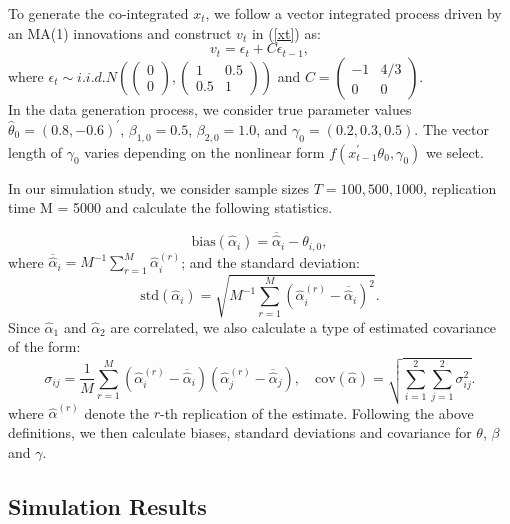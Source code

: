 \documentclass[a4paper,12pt,times,numbered,print,index]{report}
\numberwithin{equation}{section}
\begin{document}
	To generate the co-integrated $x_t$, we follow a vector integrated process driven by an MA(1) innovations and construct $v_t$ in (\ref{xt}) as:
	$$v_t = \epsilon_t + C\epsilon_{t-1},$$
	where $\epsilon_{t} \sim i.i.d. N\left(\left(\begin{array}{c}
	0 \\
	0
	\end{array}\right)
	,\left(\begin{array}{cc}1 & 0.5 \\ 0.5 & 1\end{array}\right)\right)$ and $C=\left(\begin{array}{cc} -1  & 4/ 3 \\ 0 & 0\end{array}\right)$. 
	\\
	
	In the data generation process, we consider true parameter values $\hat{\theta}_0 = (0.8, -0.6)^{\prime}$, $\beta_{1,0} = 0.5$, $\beta_{2,0} = 1.0$, and $\gamma_0 = (0.2, 0.3, 0.5)$. The vector length of $\gamma_{0}$ varies depending on the nonlinear form $f\left(x_{t-1}^{\prime }\theta _{0},\gamma _{0}\right)$ we select. 
	
	In our simulation study, we consider sample sizes $T = 100, 500,  1000$, replication time M = 5000 and calculate the following statistics.
	
	\[
	\text{bias}({\hat\alpha_i})=\overline{\widehat{\alpha}}_{i}-\theta _{i,0}, 
	\]%
	where $\overline{\widehat{\alpha}}_{i}=M^{-1}\sum_{r=1}^{M}\widehat{\alpha}_{i}^{(r)} $; and the standard deviation: 
	\[
	\text{std}({\hat\alpha_i}) =\sqrt{M^{-1}\sum_{r=1}^{M}\left( \widehat{\alpha}_{i}^{(r)}-\overline{\widehat{\alpha}}_{i}\right) ^{2}}. 
	\]%
	Since $\widehat{\alpha}_1$ and $\widehat{\alpha}_{2}$ are correlated, we also calculate a type of estimated covariance of the form:
	\begin{equation*}
		\label{std of theta}
		\sigma_{ij}=\frac{1}{M} \sum_{r=1}^{M}\left(\widehat{\alpha}_{i}^{(r)}-\overline{\widehat{\alpha}}_{i}\right)\left(\widehat{\alpha}_{j}^{(r)}-\overline{\widehat{\alpha}}_{j}\right), \quad \text {cov}(\hat{\alpha}) = \sqrt{\sum_{i=1}^{2}\sum_{j=1}^{2}\sigma_{ij}^{2}}.
	\end{equation*}
	where 
	$\widehat{\alpha}^{(r)}$ denote the $r$-th replication of the estimate.
	Following the above definitions, we then calculate biases, standard deviations and covariance for $\theta$, $\beta$ and $\gamma$.
	

\subsection{Simulation Results}
\end{document}
